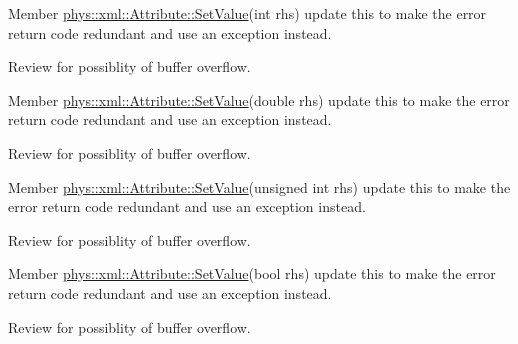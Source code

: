 \label{dd/da0/todo__todo000038}
\hypertarget{dd/da0/todo__todo000038}{}
 
\begin{DoxyDescription}
\item[Member \hyperlink{classphys_1_1xml_1_1Attribute_a693f7bd8015866c3c4979101c343ce50}{phys::xml::Attribute::SetValue}(int rhs) ]update this to make the error return code redundant and use an exception instead. 

Review for possiblity of buffer overflow. 
\end{DoxyDescription}

\label{dd/da0/todo__todo000040}
\hypertarget{dd/da0/todo__todo000040}{}
 
\begin{DoxyDescription}
\item[Member \hyperlink{classphys_1_1xml_1_1Attribute_a919034671f61ee408d616409a49dafca}{phys::xml::Attribute::SetValue}(double rhs) ]update this to make the error return code redundant and use an exception instead. 

Review for possiblity of buffer overflow. 
\end{DoxyDescription}

\label{dd/da0/todo__todo000039}
\hypertarget{dd/da0/todo__todo000039}{}
 
\begin{DoxyDescription}
\item[Member \hyperlink{classphys_1_1xml_1_1Attribute_a289ac36b218f3912224fd904ccade1ed}{phys::xml::Attribute::SetValue}(unsigned int rhs) ]update this to make the error return code redundant and use an exception instead. 

Review for possiblity of buffer overflow. 
\end{DoxyDescription}

\label{dd/da0/todo__todo000041}
\hypertarget{dd/da0/todo__todo000041}{}
 
\begin{DoxyDescription}
\item[Member \hyperlink{classphys_1_1xml_1_1Attribute_a6df4cf0f083482e69e4e6e94599a1d82}{phys::xml::Attribute::SetValue}(bool rhs) ]update this to make the error return code redundant and use an exception instead. 

Review for possiblity of buffer overflow. 
\end{DoxyDescription}

\label{dd/da0/todo__todo000042}
\hypertarget{dd/da0/todo__todo000042}{}
 
